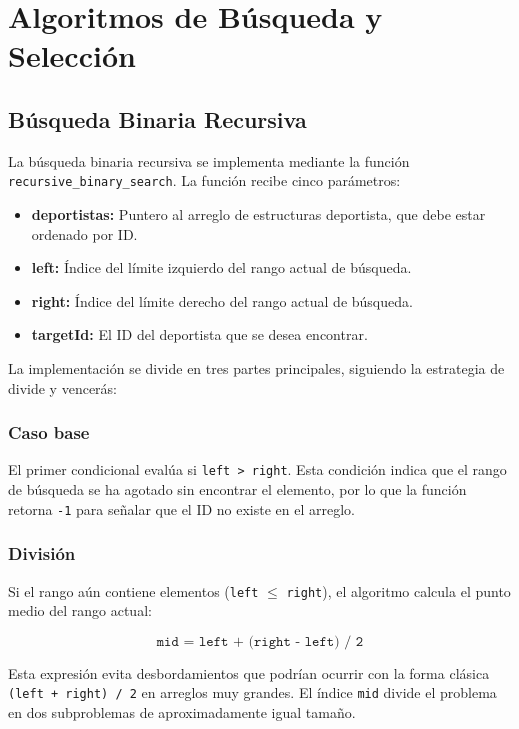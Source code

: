 \section{Algoritmos de Búsqueda y Selección}

\subsection{Búsqueda Binaria Recursiva}

La búsqueda binaria recursiva se implementa mediante la función \texttt{recursive\_binary\_search}. La función recibe cinco parámetros:

\begin{itemize}
    \item \textbf{deportistas:} Puntero al arreglo de estructuras deportista, que debe estar ordenado por ID\@.
    \item \textbf{left:} Índice del límite izquierdo del rango actual de búsqueda\@.
    \item \textbf{right:} Índice del límite derecho del rango actual de búsqueda\@.
    \item \textbf{targetId:} El ID del deportista que se desea encontrar\@.
\end{itemize}

La implementación se divide en tres partes principales, siguiendo la estrategia de divide y vencerás:

\subsubsection{Caso base}
El primer condicional evalúa si \texttt{left > right}. Esta condición indica que el rango de búsqueda se ha agotado sin encontrar el elemento, por lo que la función retorna \texttt{-1} para señalar que el ID no existe en el arreglo.

\subsubsection{División}
Si el rango aún contiene elementos (\texttt{left} $\leq$ \texttt{right}), el algoritmo calcula el punto medio del rango actual:

\[
\texttt{mid = left + (right - left) / 2}
\]

Esta expresión evita desbordamientos que podrían ocurrir con la forma clásica \texttt{(left + right) / 2} en arreglos muy grandes. El índice \texttt{mid} divide el problema en dos subproblemas de aproximadamente igual tamaño.

